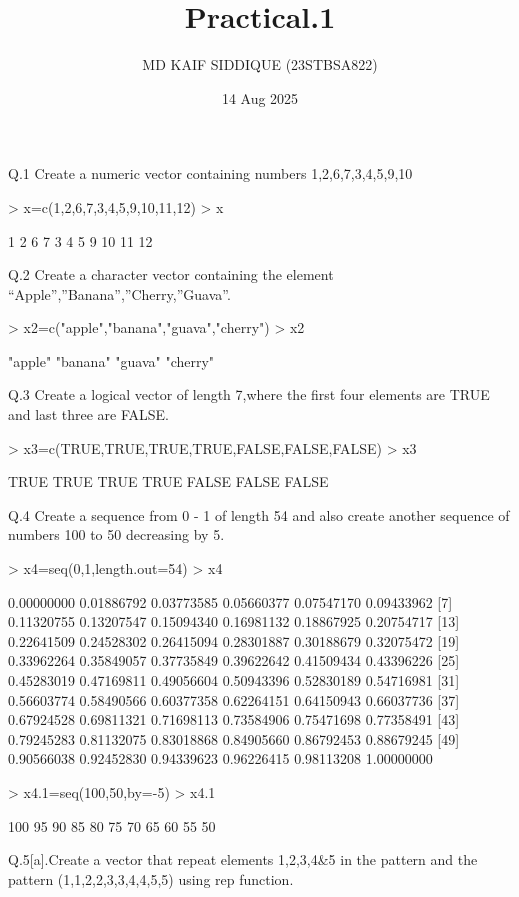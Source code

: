 \documentclass{article}
\author{MD KAIF SIDDIQUE (23STBSA822)}
\title{Practical.1}
\date{14 Aug 2025}
\begin{document}

\maketitle
Q.1 Create a numeric vector containing numbers 1,2,6,7,3,4,5,9,10
\begin{Schunk}
\begin{Sinput}
> x=c(1,2,6,7,3,4,5,9,10,11,12)
> x
\end{Sinput}
\begin{Soutput}
 [1]  1  2  6  7  3  4  5  9 10 11 12
\end{Soutput}
\end{Schunk}

Q.2 Create a character vector containing the element “Apple”,”Banana”,”Cherry,”Guava”.
\begin{Schunk}
\begin{Sinput}
> x2=c("apple","banana","guava","cherry")
> x2
\end{Sinput}
\begin{Soutput}
[1] "apple"  "banana" "guava"  "cherry"
\end{Soutput}
\end{Schunk}
Q.3 Create a logical vector of length 7,where the first four elements are TRUE   and last three are FALSE.
\begin{Schunk}
\begin{Sinput}
> x3=c(TRUE,TRUE,TRUE,TRUE,FALSE,FALSE,FALSE)
> x3
\end{Sinput}
\begin{Soutput}
[1]  TRUE  TRUE  TRUE  TRUE FALSE FALSE FALSE
\end{Soutput}
\end{Schunk}
Q.4 Create a sequence from 0 - 1 of length 54 and also create another sequence of numbers 100 to 50 decreasing by 5.
\begin{Schunk}
\begin{Sinput}
> x4=seq(0,1,length.out=54)
> x4
\end{Sinput}
\begin{Soutput}
 [1] 0.00000000 0.01886792 0.03773585 0.05660377 0.07547170 0.09433962
 [7] 0.11320755 0.13207547 0.15094340 0.16981132 0.18867925 0.20754717
[13] 0.22641509 0.24528302 0.26415094 0.28301887 0.30188679 0.32075472
[19] 0.33962264 0.35849057 0.37735849 0.39622642 0.41509434 0.43396226
[25] 0.45283019 0.47169811 0.49056604 0.50943396 0.52830189 0.54716981
[31] 0.56603774 0.58490566 0.60377358 0.62264151 0.64150943 0.66037736
[37] 0.67924528 0.69811321 0.71698113 0.73584906 0.75471698 0.77358491
[43] 0.79245283 0.81132075 0.83018868 0.84905660 0.86792453 0.88679245
[49] 0.90566038 0.92452830 0.94339623 0.96226415 0.98113208 1.00000000
\end{Soutput}
\begin{Sinput}
> x4.1=seq(100,50,by=-5)
> x4.1
\end{Sinput}
\begin{Soutput}
 [1] 100  95  90  85  80  75  70  65  60  55  50
\end{Soutput}
\end{Schunk}
Q.5[a].Create a vector that repeat elements 1,2,3,4\&5 in the pattern and the pattern (1,1,2,2,3,3,4,4,5,5) using rep function.
\end{document}
